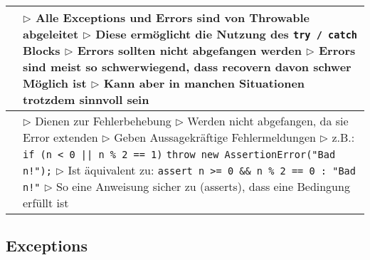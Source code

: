 \begin{table}[H]
\begin{tabular}{ | p{4cm} p{13.5cm} | }
	\makecell[l]{Throwable} & 
	\makecell[l]
	{
	$\rhd$ Alle Exceptions und Errors sind von Throwable abgeleitet \\
	$\rhd$ Diese ermöglicht die Nutzung des \texttt{try / catch} Blocks \\
	$\rhd$ Errors sollten nicht abgefangen werden \\
	$\rhd$ Errors sind meist so schwerwiegend, dass recovern davon schwer Möglich ist \\
	$\rhd$ Kann aber in manchen Situationen trotzdem sinnvoll sein \\ 
	} 	\\ \hline


	\makecell[l]{AssertionError} & 
	\makecell[l]
	{
	$\rhd$ Dienen zur Fehlerbehebung \\
	$\rhd$ Werden nicht abgefangen, da sie Error extenden \\
	$\rhd$ Geben Aussagekräftige Fehlermeldungen \\
	$\rhd$ z.B.: \\
	\hspace{0.4cm} \texttt{if (n < 0 || n \% 2 == 1)} \\
	\hspace{0.6cm} \texttt{throw new AssertionError("Bad n!");} \\
	$\rhd$ Ist äquivalent zu: \\
	\hspace{0.4cm} \texttt{assert n >= 0 \&\& n \% 2 == 0 : "Bad n!"} \\
	$\rhd$ So eine Anweisung sicher zu (asserts), dass eine Bedingung erfüllt ist
	} 	\\ \hline

	
	\end{tabular}
	\end{table}



\subsection{Exceptions}


